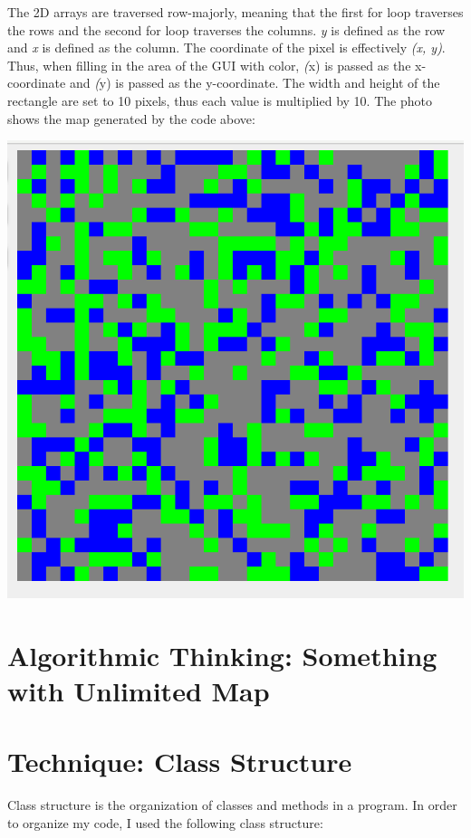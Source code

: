 \documentclass[titlepage]{article}
\begin{document}
The 2D arrays are traversed row-majorly, meaning that the first for loop traverses the rows and the second for loop traverses the columns. \emph{y} is defined as the row and \emph{x} is defined as the column. The coordinate of the pixel is effectively \emph{(x, y)}. Thus, when filling in the area of the GUI with color, \emph(x) is passed as the x-coordinate and \emph(y) is passed as the y-coordinate. The width and height of the rectangle are set to 10 pixels, thus each value is multiplied by 10. The photo shows the map generated by the code above:

\vspace*{5mm}

\includegraphics[width=\linewidth]{images/SCR-20221202-hfj.png}


\pagebreak
\section{Algorithmic Thinking: Something with Unlimited Map}
\pagebreak
\section{Technique: Class Structure}

Class structure is the organization of classes and methods in a program. In order to organize my code, I used the following class structure:
\end{document}
